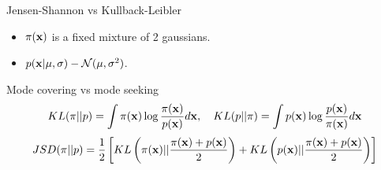 \begin{frame}{Jensen-Shannon vs Kullback-Leibler }
	\begin{itemize}
		\item $\pi(\mathbf{x})$ is a fixed mixture of 2 gaussians.
		\item $p(\mathbf{x} | \mu, \sigma) - \mathcal{N}(\mu, \sigma^2)$.
	\end{itemize}
	\begin{block}{Mode covering vs mode seeking}
		\vspace{-0.7cm}
		\[
		KL(\pi || p) = \int \pi(\mathbf{x}) \log \frac{\pi(\mathbf{x})}{p(\mathbf{x})}d\mathbf{x}, \quad KL(p || \pi) = \int p(\mathbf{x}) \log \frac{p(\mathbf{x})}{\pi(\mathbf{x})}d\mathbf{x}
		\]
		\[
		JSD(\pi || p) = \frac{1}{2} \left[KL \left(\pi(\mathbf{x}) || \frac{\pi(\mathbf{x}) + p(\mathbf{x})}{2}\right) + KL \left(p(\mathbf{x}) || \frac{\pi(\mathbf{x}) + p(\mathbf{x})}{2}\right) \right]
		\]
		\vspace{-0.7cm}
		

\end{block}
\end{frame}

